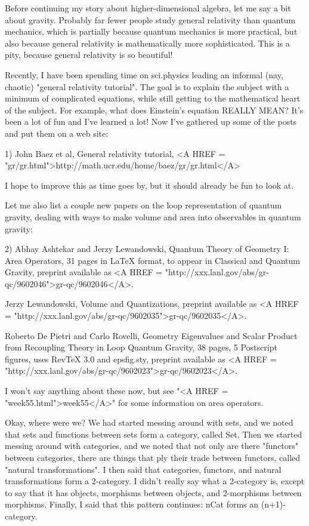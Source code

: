 


Before continuing my story about higher-dimensional algebra, let me say
a bit about gravity.  Probably far fewer people study general relativity
than quantum mechanics, which is partially because quantum mechanics is
more practical, but also because general relativity is mathematically
more sophisticated.  This is a pity, because general relativity is so
beautiful!

Recently, I have been spending time on sci.physics leading an informal
(nay, chaotic) "general relativity tutorial".  The goal is to explain
the subject with a minimum of complicated equations, while still getting
to the mathematical heart of the subject.  For example, what does
Einstein's equation REALLY MEAN?  It's been a lot of fun and I've
learned a lot!  Now I've gathered up some of the posts and put them on a
web site:

1) John Baez et al, General relativity tutorial, <A HREF =
"gr/gr.html">http://math.ucr.edu/home/baez/gr/gr.html</A> 

I hope to improve this as time goes by, but it should already be fun to
look at.

Let me also list a couple new papers on the loop representation of quantum
gravity, dealing with ways to make volume and area into observables in
quantum gravity:

2) Abhay Ashtekar and Jerzy Lewandowski, Quantum Theory of Geometry I:
Area Operators, 31 pages in LaTeX format, to appear in Classical and
Quantum Gravity, preprint available as <A HREF = "http://xxx.lanl.gov/abs/gr-qc/9602046">gr-qc/9602046</A>. 

Jerzy Lewandowski, Volume and Quantizations, preprint available as
<A HREF = "http://xxx.lanl.gov/abs/gr-qc/9602035">gr-qc/9602035</A>. 

Roberto De Pietri and Carlo Rovelli, Geometry Eigenvalues and Scalar
Product from Recoupling Theory in Loop Quantum Gravity, 38 pages, 5
Postscript figures, uses RevTeX 3.0 and epsfig.sty, preprint available
as  <A HREF = "http://xxx.lanl.gov/abs/gr-qc/9602023">gr-qc/9602023</A>.

I won't say anything about these now, but see "<A HREF =
"week55.html">week55</A>" for some information on area operators.



 Okay, where were we?  We had started messing around with sets, and
we noted that sets and functions between sets form a category, called
Set.  Then we started messing around with categories, and we noted that
not only are there "functors" between categories, there are
things that ply their trade between functors, called "natural
transformations".  I then said that categories, functors, and
natural transformations form a 2-category.   I didn't really say what a
2-category is, except to say that it has objects, morphisms between
objects, and 2-morphisms between morphisms.  Finally, I said that this
pattern continues: nCat forms an (n+1)-category.

